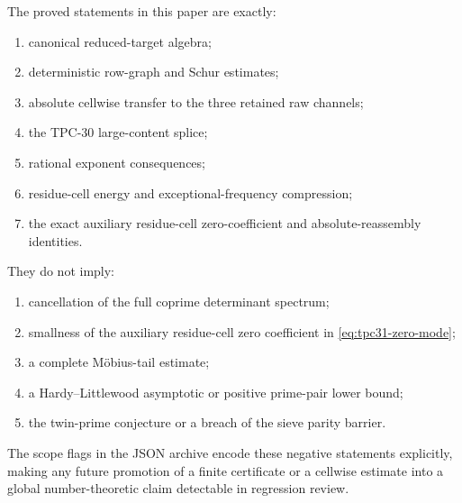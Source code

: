 The proved statements in this paper are exactly:
\begin{enumerate}[label=\textup{(\alph*)}]
 \item canonical reduced-target algebra;
 \item deterministic row-graph and Schur estimates;
 \item absolute cellwise transfer to the three retained raw channels;
 \item the TPC-30 large-content splice;
 \item rational exponent consequences;
 \item residue-cell energy and exceptional-frequency compression;
 \item the exact auxiliary residue-cell zero-coefficient and
 absolute-reassembly identities.
\end{enumerate}
\par\medskip\noindent
They do not imply:
\begin{enumerate}[label=\textup{(\alph*)}]
 \item cancellation of the full coprime determinant spectrum;
 \item smallness of the auxiliary residue-cell zero coefficient in
 \eqref{eq:tpc31-zero-mode};
 \item a complete M\"obius-tail estimate;
 \item a Hardy--Littlewood asymptotic or positive prime-pair lower
 bound;
 \item the twin-prime conjecture or a breach of the sieve parity
 barrier.
\end{enumerate}

The scope flags in the JSON archive encode these negative statements
explicitly, making any future promotion of a finite certificate or a
cellwise estimate into a global number-theoretic claim detectable in
regression review.
